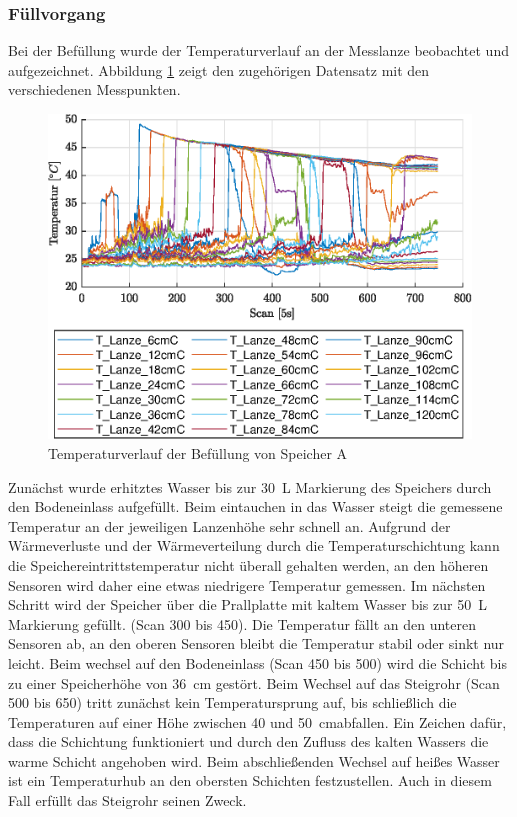 \subsubsection{Füllvorgang}
Bei der Befüllung wurde der Temperaturverlauf an der Messlanze beobachtet und aufgezeichnet. Abbildung \ref{fig:SpAfill} zeigt den zugehörigen Datensatz mit den verschiedenen Messpunkten.

\begin{figure}[H]
	\centering
	\includegraphics[width=\textwidth]{../DATA/SpA_Lanzen.eps}
	\caption[Temperaturverlauf Speicher A]{Temperaturverlauf der Befüllung von Speicher A}
	\label{fig:SpAfill}
\end{figure}

Zunächst wurde erhitztes Wasser bis zur \SI{30}{\liter} Markierung des Speichers durch den Bodeneinlass aufgefüllt. Beim eintauchen in das Wasser steigt die gemessene Temperatur an der jeweiligen Lanzenhöhe sehr schnell an. Aufgrund der Wärmeverluste und der Wärmeverteilung durch die Temperaturschichtung kann die Speichereintrittstemperatur nicht überall gehalten werden, an den höheren Sensoren wird daher eine etwas niedrigere Temperatur gemessen. Im nächsten Schritt wird der Speicher über die Prallplatte mit kaltem Wasser bis zur \SI{50}{\liter} Markierung gefüllt. (Scan 300 bis 450). Die Temperatur fällt an den unteren Sensoren ab, an den oberen Sensoren bleibt die Temperatur stabil oder sinkt nur leicht. Beim wechsel auf den Bodeneinlass (Scan 450 bis 500) wird die Schicht bis zu einer Speicherhöhe von \SI{36}{\centi\meter} gestört. Beim Wechsel auf das Steigrohr (Scan 500 bis 650) tritt zunächst kein Temperatursprung auf, bis schließlich die Temperaturen auf einer Höhe zwischen 40 und \SI{50}{\centi\meter}abfallen. Ein Zeichen dafür, dass die Schichtung funktioniert und durch den Zufluss des kalten Wassers die warme Schicht angehoben wird. Beim abschließenden Wechsel auf heißes Wasser ist ein Temperaturhub an den obersten Schichten festzustellen. Auch in diesem Fall erfüllt das Steigrohr seinen Zweck.

